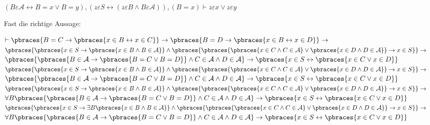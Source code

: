 \begin{solution}
\begin{algorithmic}[1]
\end{algorithmic}

\begin{algorithmic}[1]
  \State $(B \varepsilon \mathcal{A} \leftrightarrow B = x \lor B = y),
  (z \varepsilon S \leftrightarrow (z \varepsilon B \land B \varepsilon \mathcal{A})),
  (B = x)
  \vdash z \varepsilon x \lor z \varepsilon y$
\end{algorithmic}

Fast die richtige Aussage:

\begin{algorithmic}[1]
	\State $\vdash \pbraces{B = C\rightarrow \pbraces{x \in B \leftrightarrow x \in C}} \rightarrow \pbraces{B = D\rightarrow \pbraces{x \in B  \leftrightarrow x \in D}} \rightarrow$
	\State $\pbraces{\pbraces{x \in S \rightarrow \pbraces{x \in B \land B \in \mathcal{A}}} \land \pbraces{\pbraces{\pbraces{x \in C \land C \in \mathcal{A}} \lor \pbraces{x \in D \land D \in \mathcal{A}}}\rightarrow x \in S}} \rightarrow$
	\State $\pbraces{\pbraces{B \in \mathcal{A} \rightarrow \pbraces{B = C \lor B = D}} \land C \in \mathcal{A} \land D \in \mathcal{A}} \rightarrow \pbraces{x \in S \leftrightarrow \pbraces{x \in C \lor x \in D}}$ 
	\State $\pbraces{\pbraces{x \in S \rightarrow \pbraces{x \in B \land B \in \mathcal{A}}} \land \pbraces{\pbraces{\pbraces{x \in C \land C \in \mathcal{A}} \lor \pbraces{x \in D \land D \in \mathcal{A}}}\rightarrow x \in S}} \rightarrow$
	\State $\pbraces{\pbraces{B \in \mathcal{A} \rightarrow \pbraces{B = C \lor B = D}} \land C \in \mathcal{A} \land D \in \mathcal{A}} \rightarrow \pbraces{x \in S \leftrightarrow \pbraces{x \in C \lor x \in D}}$ 
	\State $\pbraces{\pbraces{x \in S \rightarrow \pbraces{x \in B \land B \in \mathcal{A}}} \land \pbraces{\pbraces{\pbraces{x \in C \land C \in \mathcal{A}} \lor \pbraces{x \in D \land D \in \mathcal{A}}}\rightarrow x \in S}} \rightarrow$
	\State $\forall B \pbraces{\pbraces{B \in \mathcal{A} \rightarrow \pbraces{B = C \lor B = D}} \land C \in \mathcal{A} \land D \in \mathcal{A}} \rightarrow \pbraces{x \in S \leftrightarrow \pbraces{x \in C \lor x \in D}}$ 
	\State $\pbraces{\pbraces{x \in S \rightarrow \exists B \pbraces{x \in B \land B \in \mathcal{A}}} \land \pbraces{\pbraces{\pbraces{x \in C \land C \in \mathcal{A}} \lor \pbraces{x \in D \land D \in \mathcal{A}}}\rightarrow x \in S}} \rightarrow$
	\State $\forall B \pbraces{\pbraces{B \in \mathcal{A} \rightarrow \pbraces{B = C \lor B = D}} \land C \in \mathcal{A} \land D \in \mathcal{A}} \rightarrow \pbraces{x \in S \leftrightarrow \pbraces{x \in C \lor x \in D}}$ 

\end{algorithmic}
\end{solution}
